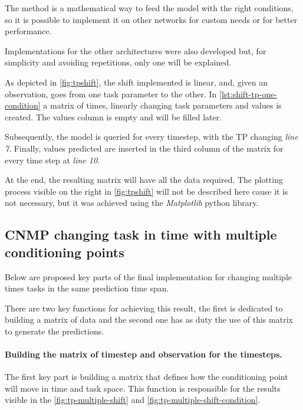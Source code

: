 The method is a mathematical way to feed the model with the right conditions, so it is possible to implement it on other networks for custom needs or for better performance.

Implementations for the other architectures were also developed but, for simplicity and avoiding repetitions, only one will be explained. 

As depicted in \cref{fig:tpshift}, the shift implemented is linear, and, given an observation, goes from one task parameter to the other. In \cref{lst:shift-tp-one-condition} a matrix of times, linearly changing task parameters and values is created. The values column is empty and will be filled later.

Subsequently, the model is queried for every timestep, with the TP changing \emph{line 7}. 
Finally, values predicted are inserted in the third column of the matrix for every time step at \emph{line 10}. 

At the end, the resulting matrix will have all the data required. The plotting process visible on the right in \cref{fig:tpshift} will not be described here cause it is not necessary, but it was achieved using the \emph{Matplotlib} python library.  




\subsection{CNMP changing task in time with multiple conditioning points}
Below are proposed key parts of the final implementation for changing multiple times tasks in the same prediction time span.

There are two key functions for achieving this result, the first is dedicated to building a matrix of data and the second one has as duty the use of this matrix to generate the predictions. 

\paragraph{Building the matrix of timestep and observation for the timesteps. }
The first key part is building a matrix that defines how the conditioning point will move in time and task space. This function is responsible for the results visible in the \cref{fig:tp-multiple-shift} and \cref{fig:tp-multiple-shift-condition}. 

